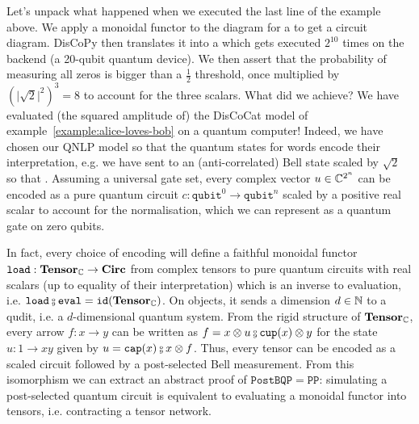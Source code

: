 Let's unpack what happened when we executed the last line of the example above.
We apply a monoidal functor  to the diagram for a  to get a circuit diagram.
DisCoPy then translates it into a  which gets executed $2^{10}$ times on the  backend (a 20-qubit quantum device).
We then assert that the probability of measuring all zeros is bigger than a $\frac{1}{2}$ threshold, once multiplied by $(\vert \sqrt{2} \vert^2)^3 = 8$ to account for the three scalars.
What did we achieve?
We have evaluated (the squared amplitude of) the DisCoCat model of example~\ref{example:alice-loves-bob} on a quantum computer!
Indeed, we have chosen our QNLP model so that the quantum states for words encode their interpretation, e.g. we have sent  to an (anti-correlated) Bell state scaled by $\sqrt{2}$ so that  \py{= [[0, 1], [1, 0]]}.
Assuming a universal gate set, every complex vector $u \in \mathbb{C}^{2^n}$ can be encoded as a pure quantum circuit $c : \mathtt{qubit}^0 \to \mathtt{qubit}^n$ scaled by a positive real scalar to account for the normalisation, which we can represent as a quantum gate on zero qubits.

In fact, every choice of encoding will define a faithful monoidal functor $\mathtt{load} : \mathbf{Tensor}_{\mathbb{C}} \to \mathbf{Circ}$ from complex tensors to pure quantum circuits with real scalars (up to equality of their interpretation) which is an inverse to evaluation, i.e. $\mathtt{load} \fcmp \mathtt{eval} = \id(\mathbf{Tensor}_\C)$.
On objects, it sends a dimension $d \in \mathbb{N}$ to a qudit, i.e. a $d$-dimensional quantum system.
From the rigid structure of $\mathbf{Tensor}_{\mathbb{C}}$, every arrow $f : x \to y$ can be written as $f = x \otimes u \fcmp \ttcup(x) \otimes y$ for the state $u : 1 \to x y$ given by $u = \ttcap(x) \fcmp x \otimes f$.
Thus, every tensor can be encoded as a scaled circuit followed by a post-selected Bell measurement.
From this isomorphism we can extract an abstract proof of $\mathtt{PostBQP} = \mathtt{PP}$: simulating a post-selected quantum circuit is equivalent to evaluating a monoidal functor into tensors, i.e. contracting a tensor network.

